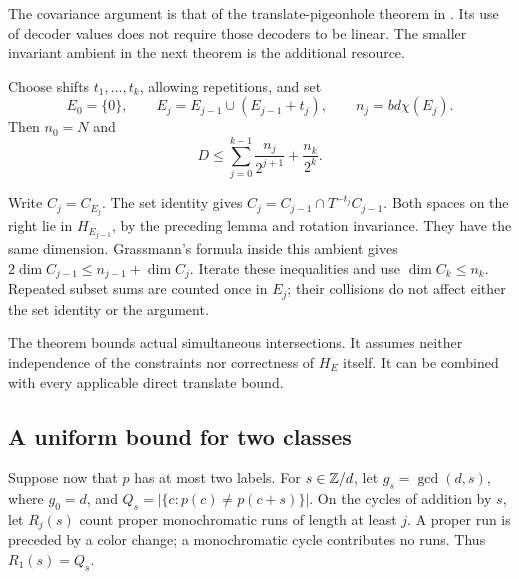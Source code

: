 The covariance argument is that of the translate-pigeonhole theorem in
\cite{SeventeenthPaper2026}. Its use of decoder values does not require those
decoders to be linear. The smaller invariant ambient in the next theorem
is the additional resource.

\begin{theorem}\label{thm:iterated-tp}
Choose shifts $t_1,\ldots,t_k$, allowing repetitions, and set
\[
 E_0=\{0\},\qquad E_j=E_{j-1}\cup(E_{j-1}+t_j),\qquad
 n_j=bd\chi(E_j).
\]
Then $n_0=N$ and
\begin{equation}\label{eq:iterated-tp}
 D\le\sum_{j=0}^{k-1}\frac{n_j}{2^{j+1}}+\frac{n_k}{2^k}.
\end{equation}
\end{theorem}
\begin{outline}
Write $C_j=C_{E_j}$. The set identity gives
$C_j=C_{j-1}\cap T^{-t_j}C_{j-1}$. Both spaces on the right lie in
$H_{E_{j-1}}$, by the preceding lemma and rotation invariance. They have
the same dimension. Grassmann's formula inside this ambient gives
$2\dim C_{j-1}\le n_{j-1}+\dim C_j$. Iterate these inequalities and
use $\dim C_k\le n_k$. Repeated subset sums are counted once in $E_j$;
their collisions do not affect either the set identity or the argument.
\end{outline}

The theorem bounds actual simultaneous intersections. It assumes neither
independence of the constraints nor correctness of $H_E$ itself. It can
be combined with every applicable direct translate bound.

\subsection{A uniform bound for two classes}

Suppose now that $p$ has at most two labels. For $s\in\mathbb{Z}/d$, let
$g_s=\gcd(d,s)$, where $g_0=d$, and
$Q_s=|\{c:p(c)\ne p(c+s)\}|$.
On the cycles of addition by $s$, let $R_j(s)$ count proper monochromatic
runs of length at least $j$. A proper run is preceded by a color change;
a monochromatic cycle contributes no runs. Thus $R_1(s)=Q_s$.

